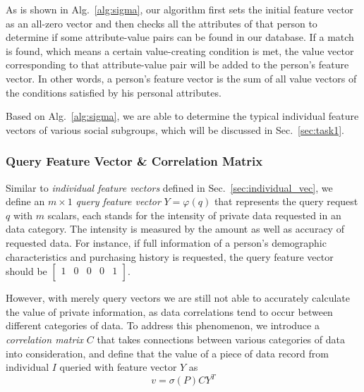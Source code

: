 \documentclass{mcmthesis}
\begin{document}
As is shown in Alg.~\ref{alg:sigma}, our algorithm first sets the initial feature vector as an all-zero vector and then checks all the attributes of that person to determine if some attribute-value pairs can be found in our database. If a match is found, which means a certain value-creating condition is met, the value vector corresponding to that attribute-value pair will be added to the person's feature vector. In other words, a person's feature vector is the sum of all value vectors of the conditions satisfied by his personal attributes.



Based on Alg.~\ref{alg:sigma}, we are able to determine the typical individual feature vectors of various social subgroups, which will be discussed in Sec.~\ref{sec:task1}.


\subsubsection{Query Feature Vector \& Correlation Matrix}
\label{sec:query_vec}

Similar to \emph{individual feature vectors} defined in Sec.~\ref{sec:individual_vec}, we define an $m \times 1$ \emph{query feature vector} $Y = \varphi(q)$ that represents the query request $q$ with $m$ scalars, each stands for the intensity of private data requested in an data category. The intensity is measured by the amount as well as accuracy of requested data. For instance, if full information of a person's demographic characteristics and purchasing history is requested, the query feature vector should be $\left[\begin{matrix} 1 & 0 & 0 & 0 & 1 \\ \end{matrix}\right]$. 

However, with merely query vectors we are still not able to accurately calculate the value of private information, as data correlations tend to occur between different categories of data. To address this phenomenon, we introduce a \emph{correlation matrix} $C$ that takes connections between various categories of data into consideration, and define that the value of a piece of data record from individual $I$ queried with feature vector $Y$ as
\begin{equation}
    v = \sigma (P) C Y^T \label{eqn:value}
\end{equation}
\end{document}
